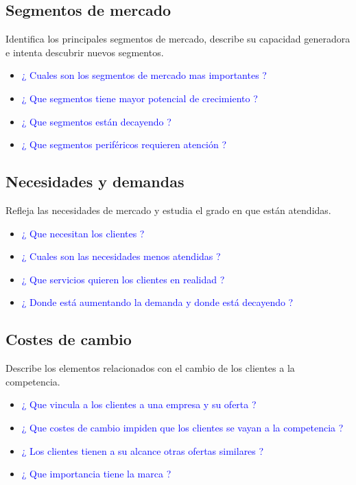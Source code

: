 \documentclass[11pt]{book}
\begin{document}
\subsection{Segmentos de mercado}
Identifica los principales segmentos de mercado, describe su capacidad generadora e intenta descubrir nuevos segmentos.

\begin{itemize}
\item\textcolor{blue}{ ¿ Cuales son los segmentos de mercado mas importantes ? }
\item\textcolor{blue}{ ¿ Que segmentos tiene mayor potencial de crecimiento ? }
\item\textcolor{blue}{ ¿ Que segmentos están decayendo ? }
\item\textcolor{blue}{ ¿ Que segmentos periféricos requieren atención ? }
\end{itemize}
\subsection{Necesidades y demandas}
Refleja las necesidades de mercado y estudia el grado en que están atendidas.
\begin{itemize}
\item\textcolor{blue}{ ¿ Que necesitan los clientes ? }
\item\textcolor{blue}{ ¿ Cuales son las necesidades menos atendidas ? }
\item\textcolor{blue}{ ¿ Que servicios quieren los clientes en realidad ? }
\item\textcolor{blue}{ ¿ Donde está aumentando la demanda y donde está decayendo ? }
\end{itemize}
\subsection{Costes de cambio}
Describe los elementos relacionados con el cambio de los clientes a la competencia.
\begin{itemize}
\item\textcolor{blue}{ ¿ Que vincula a los clientes a una empresa y su oferta ? }
\item\textcolor{blue}{ ¿ Que costes de cambio impiden que los clientes se vayan a la competencia ? }
\item\textcolor{blue}{ ¿ Los clientes tienen a su alcance otras ofertas similares ? }
\item\textcolor{blue}{ ¿ Que importancia tiene la marca ? }
\end{itemize}
\end{document}
